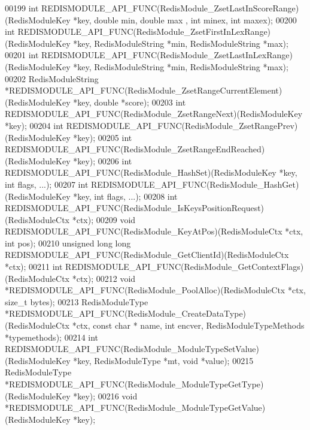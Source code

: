 \begin{DoxyCode}
00199 \textcolor{keywordtype}{int} REDISMODULE\_API\_FUNC(RedisModule\_ZsetLastInScoreRange)(RedisModuleKey *key, \textcolor{keywordtype}{double} min, \textcolor{keywordtype}{double} max
      , \textcolor{keywordtype}{int} minex, \textcolor{keywordtype}{int} maxex);
00200 \textcolor{keywordtype}{int} REDISMODULE\_API\_FUNC(RedisModule\_ZsetFirstInLexRange)(RedisModuleKey *key, RedisModuleString *min,
       RedisModuleString *max);
00201 \textcolor{keywordtype}{int} REDISMODULE\_API\_FUNC(RedisModule\_ZsetLastInLexRange)(RedisModuleKey *key, RedisModuleString *min, 
      RedisModuleString *max);
00202 RedisModuleString *REDISMODULE\_API\_FUNC(RedisModule\_ZsetRangeCurrentElement)(RedisModuleKey *key, \textcolor{keywordtype}{
      double} *score);
00203 \textcolor{keywordtype}{int} REDISMODULE\_API\_FUNC(RedisModule\_ZsetRangeNext)(RedisModuleKey *key);
00204 \textcolor{keywordtype}{int} REDISMODULE\_API\_FUNC(RedisModule\_ZsetRangePrev)(RedisModuleKey *key);
00205 \textcolor{keywordtype}{int} REDISMODULE\_API\_FUNC(RedisModule\_ZsetRangeEndReached)(RedisModuleKey *key);
00206 \textcolor{keywordtype}{int} REDISMODULE\_API\_FUNC(RedisModule\_HashSet)(RedisModuleKey *key, \textcolor{keywordtype}{int} flags, ...);
00207 \textcolor{keywordtype}{int} REDISMODULE\_API\_FUNC(RedisModule\_HashGet)(RedisModuleKey *key, \textcolor{keywordtype}{int} flags, ...);
00208 \textcolor{keywordtype}{int} REDISMODULE\_API\_FUNC(RedisModule\_IsKeysPositionRequest)(RedisModuleCtx *ctx);
00209 \textcolor{keywordtype}{void} REDISMODULE\_API\_FUNC(RedisModule\_KeyAtPos)(RedisModuleCtx *ctx, \textcolor{keywordtype}{int} pos);
00210 \textcolor{keywordtype}{unsigned} \textcolor{keywordtype}{long} \textcolor{keywordtype}{long} REDISMODULE\_API\_FUNC(RedisModule\_GetClientId)(RedisModuleCtx *ctx);
00211 \textcolor{keywordtype}{int} REDISMODULE\_API\_FUNC(RedisModule\_GetContextFlags)(RedisModuleCtx *ctx);
00212 \textcolor{keywordtype}{void} *REDISMODULE\_API\_FUNC(RedisModule\_PoolAlloc)(RedisModuleCtx *ctx, size\_t bytes);
00213 RedisModuleType *REDISMODULE\_API\_FUNC(RedisModule\_CreateDataType)(RedisModuleCtx *ctx, \textcolor{keyword}{const} \textcolor{keywordtype}{char} *
      name, \textcolor{keywordtype}{int} encver, RedisModuleTypeMethods *typemethods);
00214 \textcolor{keywordtype}{int} REDISMODULE\_API\_FUNC(RedisModule\_ModuleTypeSetValue)(RedisModuleKey *key, RedisModuleType *mt, \textcolor{keywordtype}{
      void} *value);
00215 RedisModuleType *REDISMODULE\_API\_FUNC(RedisModule\_ModuleTypeGetType)(RedisModuleKey *key);
00216 \textcolor{keywordtype}{void} *REDISMODULE\_API\_FUNC(RedisModule\_ModuleTypeGetValue)(RedisModuleKey *key);

\end{DoxyCode}
